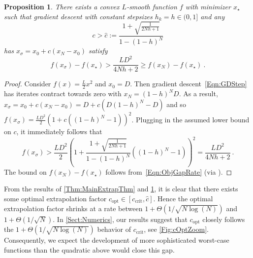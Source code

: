 \documentclass[11pt]{article}
\numberwithin{equation}{section}
\newtheorem{proposition}[thm]{Proposition}
\theoremstyle{definition}
\theoremstyle{definition}
\theoremstyle{definition}
\newcommand{\1}{\mathbf{1}}
\newcommand{\xStar}{x_\star}
\newcommand{\xSpecial}{x_\sigma}
\newcommand{\cHat}{\hat{c}}
\newcommand{\cCrit}{c_\mathrm{crit}}
\newcommand{\cOpt}{c_{\text{opt}}}
\begin{document}
\begin{proposition} \label{Prop:cHat}
    There exists a convex $L$-smooth function $f$ with minimizer $\xStar$ such that gradient descent with constant stepsizes $h_k = h\in(0,1]$ and any
    $$c > \cHat := \frac{1 + \sqrt{\frac{1}{2Nh+1}}}{1 - (1-h)^N} $$
    has $\xSpecial = x_0 + c(x_N-x_0)$ satisfy
    \begin{equation*}
        f(\xSpecial) - f(\xStar) > \frac{LD^2}{4Nh+2} \geq f(x_N) - f(\xStar) \ . 
    \end{equation*}
\end{proposition}
\begin{proof}
    Consider $f(x) = \frac{L}{2}x^2$ and $x_0=D$. Then gradient descent~\eqref{Eqn:GDStep} has iterates contract towards zero with $x_N = (1-h)^N D$. As a result, $\xSpecial = x_0 + c(x_N-x_0) = D + c(D(1-h)^N - D)$ and so $f(\xSpecial) = \frac{LD^2}{2}(1 + c((1-h)^N - 1))^2$. Plugging in the assumed lower bound on $c$, it immediately follows that
    $$f(\xSpecial) > \frac{LD^2}{2}\left(1 + \frac{1 + \sqrt{\frac{1}{2Nh+1}}}{1 - (1-h)^N}((1-h)^N - 1)\right)^2 = \frac{LD^2}{4Nh+2} \ . $$
    The bound on $f(x_N) - f(x_\star)$ follows from~\eqref{Eqn:ObjGapRate} (via \cite{FirstPEP}).
\end{proof}

From the results of \cref{Thm:MainExtrapThm} and \cref{Prop:cHat}, it is clear that there exists some optimal extrapolation factor $\cOpt \in [\cCrit, \cHat]$. Hence the optimal extrapolation factor shrinks at a rate between $1+\Theta(1/\sqrt{N\log(N)})$ and $1+\Theta(1/\sqrt{N})$.
In \cref{Sect:Numerics}, our results suggest that $\cOpt$ closely follows the $1+\Theta(1/\sqrt{N\log(N)})$ behavior of $\cCrit$, see \cref{Fig:cOptZoom}. Consequently, we expect the development of more sophisticated worst-case functions than the quadratic above would close this gap.
\end{document}
